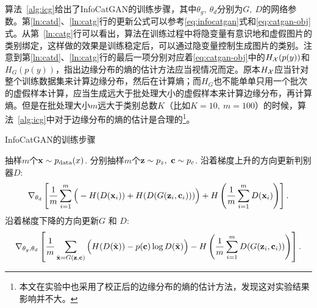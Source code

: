 算法~\ref{alg:icg}给出了InfoCatGAN的训练步骤，其中$\theta_g,~\theta_d$分别为$G, ~D$的网络参数。第\ref{ln:catd}、\ref{ln:catg}行的更新公式可以参考\eqref{eq:infocatgan}式和\eqref{eq:catgan-obj}式。从第~\ref{ln:catg}行可以看出，算法在训练过程中将隐变量有意识地和虚假图片的类别绑定，这样做的效果是训练稳定后，可以通过隐变量控制生成图片的类别。注意到第\ref{ln:catd}、\ref{ln:catg}行的最后一项分别对应着\eqref{eq:catgan-obj}中的$H_{\mathcal{X}}(p(y))$和$H_{G}(p(y))$，\citet{springenberg2015unsupervised}指出边缘分布的熵的估计方法应当视情况而定。原本$H_{\mathcal{X}}$应当针对整个训练数据集来计算边缘分布，然后在计算熵；而$H_G$也不能单单只用一个批次的虚假样本计算，应当生成远大于批处理大小的虚假样本来计算边缘分布，再计算熵。但是在批处理大小$m$远大于类别总数$K$（比如$K=10, ~m=100$）的时候，算法~\ref{alg:icg}中对于边缘分布的熵的估计是合理的\footnote{本文在实验中也采用了校正后的边缘分布的熵的估计方法，发现这对实验结果影响并不大。}。
\begin{algorithm}[htbp]
  \small
  \caption{InfoCatGAN的训练步骤}
  \label{alg:icg}
  \begin{algorithmic}[1]
      \State 抽样$m$个$\mathbf{x} \sim p_{\text{data}}(x)$.
      \State 分别抽样$m$个$\mathbf{z}\sim p_z, ~\mathbf{c}\sim p_c$.
      \State 沿着梯度上升的方向更新判别器$D$:
      \label{ln:catd}
      \[
        \nabla_{\theta_d} \left[ 
          \frac{1}{m} \sum_{i=1}^m \Big( 
            - H(D(\mathbf{x}_i)) + H(D(G(\mathbf{z}_i, \mathbf{c}_i)))
          \Big) + H\left( \frac{1}{m}\sum_{i=1}^m D(\mathbf{x}_i) \right)
        \right].
      \]
      \State 沿着梯度下降的方向更新$G$ 和 $D$:
      \label{ln:catg}
      \[
        \nabla_{\theta_g,\theta_d} \left[ 
          \frac{1}{m} \sum_{\tilde{\mathbf{x}} = G(\mathbf{z},\mathbf{c})} \Big(
            H(D(\tilde{\mathbf{x}})) - p(\mathbf{c})\log D(\tilde{\mathbf{x}})
          \Big)
          - H \left( 
            \frac{1}{m}\sum_{i=1}^m D(G(\mathbf{z}_i, \mathbf{c}_i))
          \right)
        \right].
      \]
    \EndFor
  \end{algorithmic}
\end{algorithm}



